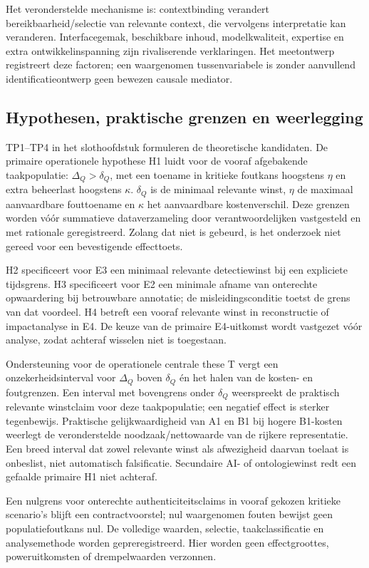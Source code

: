 Het veronderstelde mechanisme is: contextbinding verandert bereikbaarheid/selectie van relevante context, die vervolgens interpretatie kan veranderen. Interfacegemak, beschikbare inhoud, modelkwaliteit, expertise en extra ontwikkelinspanning zijn rivaliserende verklaringen. Het meetontwerp registreert deze factoren; een waargenomen tussenvariabele is zonder aanvullend identificatieontwerp geen bewezen causale mediator.

\subsection{Hypothesen, praktische grenzen en weerlegging}
TP1--TP4 in het slothoofdstuk formuleren de theoretische kandidaten. De primaire operationele hypothese H1 luidt voor de vooraf afgebakende taakpopulatie: $\Delta_Q>\delta_Q$, met een toename in kritieke foutkans hoogstens $\eta$ en extra beheerlast hoogstens $\kappa$. $\delta_Q$ is de minimaal relevante winst, $\eta$ de maximaal aanvaardbare fouttoename en $\kappa$ het aanvaardbare kostenverschil. Deze grenzen worden vóór summatieve dataverzameling door verantwoordelijken vastgesteld en met rationale geregistreerd. Zolang dat niet is gebeurd, is het onderzoek niet gereed voor een bevestigende effecttoets.

H2 specificeert voor E3 een minimaal relevante detectiewinst bij een expliciete tijdsgrens. H3 specificeert voor E2 een minimale afname van onterechte opwaardering bij betrouwbare annotatie; de misleidingsconditie toetst de grens van dat voordeel. H4 betreft een vooraf relevante winst in reconstructie of impactanalyse in E4. De keuze van de primaire E4-uitkomst wordt vastgezet vóór analyse, zodat achteraf wisselen niet is toegestaan.

Ondersteuning voor de operationele centrale these T vergt een onzekerheidsinterval voor $\Delta_Q$ boven $\delta_Q$ én het halen van de kosten- en foutgrenzen. Een interval met bovengrens onder $\delta_Q$ weerspreekt de praktisch relevante winstclaim voor deze taakpopulatie; een negatief effect is sterker tegenbewijs. Praktische gelijkwaardigheid van A1 en B1 bij hogere B1-kosten weerlegt de veronderstelde noodzaak/nettowaarde van de rijkere representatie. Een breed interval dat zowel relevante winst als afwezigheid daarvan toelaat is onbeslist, niet automatisch falsificatie. Secundaire AI- of ontologiewinst redt een gefaalde primaire H1 niet achteraf.

Een nulgrens voor onterechte authenticiteitsclaims in vooraf gekozen kritieke scenario’s blijft een contractvoorstel; nul waargenomen fouten bewijst geen populatiefoutkans nul. De volledige waarden, selectie, taakclassificatie en analysemethode worden gepreregistreerd. Hier worden geen effectgroottes, poweruitkomsten of drempelwaarden verzonnen.
